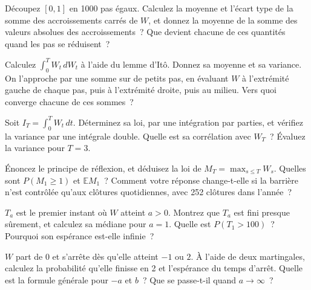 \begin{question}\label{iq:iv1:stochastic-calculus:6}
Découpez $[0, 1]$ en 1000 pas égaux. Calculez la moyenne et l'écart type de la somme des accroissements carrés de $W$, et donnez la moyenne de la somme des valeurs absolues des accroissements~? Que devient chacune de ces quantités quand les pas se réduisent~?
\end{question}

\begin{question}\label{iq:iv1:stochastic-calculus:7}
Calculez $\int_0^TW_t\,dW_t$ à l'aide du lemme d'Itô. Donnez sa moyenne et sa variance. On l'approche par une somme sur de petits pas, en évaluant $W$ à l'extrémité gauche de chaque pas, puis à l'extrémité droite, puis au milieu. Vers quoi converge chacune de ces sommes~?
\end{question}

\begin{question}\label{iq:iv1:stochastic-calculus:8}
Soit $I_T = \int_0^TW_t\,dt$. Déterminez sa loi, par une intégration par parties, et vérifiez la variance par une intégrale double. Quelle est sa corrélation avec $W_T$~? Évaluez la variance pour $T = 3$.
\end{question}

\begin{question}\label{iq:iv1:stochastic-calculus:9}
Énoncez le principe de réflexion, et déduisez la loi de $M_T = \max_{s \le T}W_s$. Quelles sont $P(M_1 \ge 1)$ et $\mathbb{E}M_1$~? Comment votre réponse change-t-elle si la barrière n'est contrôlée qu'aux clôtures quotidiennes, avec 252 clôtures dans l'année~?
\end{question}

\begin{question}\label{iq:iv1:stochastic-calculus:10}
$T_a$ est le premier instant où $W$ atteint $a > 0$. Montrez que $T_a$ est fini presque sûrement, et calculez sa médiane pour $a = 1$. Quelle est $P(T_1 > 100)$~? Pourquoi son espérance est-elle infinie~?
\end{question}

\begin{question}\label{iq:iv1:stochastic-calculus:11}
$W$ part de 0 et s'arrête dès qu'elle atteint $-1$ ou $2$. À l'aide de deux martingales, calculez la probabilité qu'elle finisse en 2 et l'espérance du temps d'arrêt. Quelle est la formule générale pour $-a$ et $b$~? Que se passe-t-il quand $a \to \infty$~?
\end{question}

